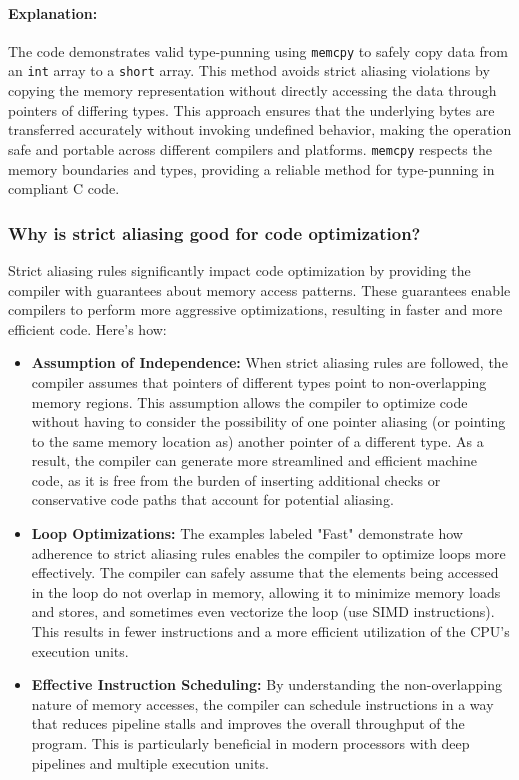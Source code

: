 \documentclass[12pt]{article}
\begin{document}
\paragraph{Explanation:}
The code demonstrates valid type-punning using \texttt{memcpy} to safely copy data from an \texttt{int} array to a \texttt{short} array. This method avoids strict aliasing violations by copying the memory representation without directly accessing the data through pointers of differing types. This approach ensures that the underlying bytes are transferred accurately without invoking undefined behavior, making the operation safe and portable across different compilers and platforms. \texttt{memcpy} respects the memory boundaries and types, providing a reliable method for type-punning in compliant C code.


\subsubsection{Why is strict aliasing good for code optimization?}

Strict aliasing rules significantly impact code optimization by providing the compiler with guarantees about memory access patterns. These guarantees enable compilers to perform more aggressive optimizations, resulting in faster and more efficient code. Here's how:

\begin{itemize}
    \item \textbf{Assumption of Independence:} When strict aliasing rules are followed, the compiler assumes that pointers of different types point to non-overlapping memory regions. This assumption allows the compiler to optimize code without having to consider the possibility of one pointer aliasing (or pointing to the same memory location as) another pointer of a different type. As a result, the compiler can generate more streamlined and efficient machine code, as it is free from the burden of inserting additional checks or conservative code paths that account for potential aliasing.

    \item \textbf{Loop Optimizations:} The examples labeled "Fast" demonstrate how adherence to strict aliasing rules enables the compiler to optimize loops more effectively. The compiler can safely assume that the elements being accessed in the loop do not overlap in memory, allowing it to minimize memory loads and stores, and sometimes even vectorize the loop (use SIMD instructions). This results in fewer instructions and a more efficient utilization of the CPU's execution units.

    \item \textbf{Effective Instruction Scheduling:} By understanding the non-overlapping nature of memory accesses, the compiler can schedule instructions in a way that reduces pipeline stalls and improves the overall throughput of the program. This is particularly beneficial in modern processors with deep pipelines and multiple execution units.

\end{itemize}
\end{document}
